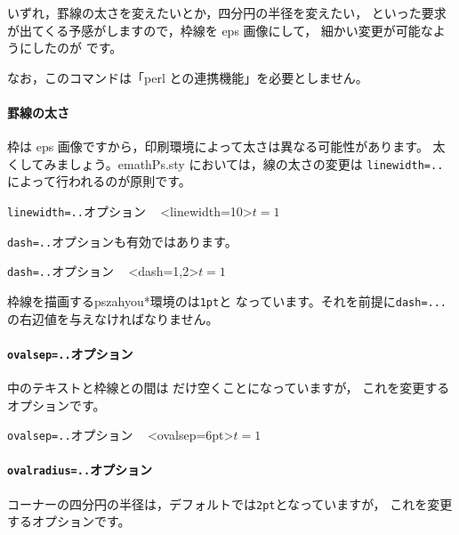 \documentclass[a4j]{jarticle}
\begin{document}
\subsubsection{\texorpdfstring{}{psovalbox}}
いずれ，罫線の太さを変えたいとか，四分円の半径を変えたい，
といった要求が出てくる予感がしますので，枠線を eps 画像にして，
細かい変更が可能なようにしたのが  です。

\begin{showEx}{}
\end{showEx}

なお，このコマンドは「perl との連携機能」を必要としません。

\paragraph{罫線の太さ}
枠は eps 画像ですから，印刷環境によって太さは異なる可能性があります。
太くしてみましょう。\textsf{emathPs.sty} においては，線の太さの変更は
\verb+linewidth=..+によって行われるのが原則です。

\begin{showEx}{\texttt{linewidth=..}オプション}
~
\psovalbox<linewidth=10>{$t=1$}
\end{showEx}

\verb+dash=..+オプションも有効ではあります。

\begin{showEx}{\texttt{dash=..}オプション}
~
\psovalbox<dash={1,2}>{$t=1$}
\end{showEx}

枠線を描画する\textsf{pszahyou*}環境のは\texttt{1pt}と
なっています。それを前提に\verb+dash=...+の右辺値を与えなければなりません。

\paragraph{\texttt{ovalsep=..}オプション}
中のテキストと枠線との間は  だけ空くことになっていますが，
これを変更するオプションです。

\begin{showEx}{\texttt{ovalsep=..}オプション}
~
\psovalbox<ovalsep=6pt>{$t=1$}
\end{showEx}

\paragraph{\texttt{ovalradius=..}オプション}
コーナーの四分円の半径は，デフォルトでは\verb+2pt+となっていますが，
これを変更するオプションです。
\end{document}
